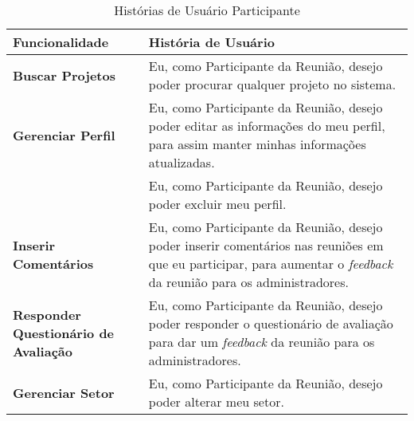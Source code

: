 \begin{table}[H]
	\begin{tabular}{|p{5.0cm}|p{10.0cm}|} 
	\hline
	\textbf{Funcionalidade} & \textbf{História de Usuário} \\ \hline
	\textbf{Buscar Projetos} & Eu, como Participante da Reunião, desejo poder procurar qualquer projeto no sistema. \\ \hline
	\textbf{Gerenciar Perfil} & Eu, como Participante da Reunião, desejo poder editar as informações do meu perfil, para assim manter minhas informações atualizadas. \\ \hline
	& Eu, como Participante da Reunião, desejo poder excluir meu perfil. \\ \hline
	\textbf{Inserir Comentários} & Eu, como Participante da Reunião, desejo poder inserir comentários nas reuniões em que eu participar, para aumentar o \textit{feedback} da reunião para os administradores. \\ \hline
	\textbf{Responder Questionário de Avaliação} & Eu, como Participante da Reunião, desejo poder responder o questionário de avaliação para dar um \textit{feedback} da reunião para os administradores.\\ \hline
	\textbf{Gerenciar Setor} & Eu, como Participante da Reunião, desejo poder alterar meu setor. \\ \hline
	\end{tabular}
	 \caption{Histórias de Usuário Participante }
	 \label{tab:historias_de_usuario_participante_parte1}
\end{table}